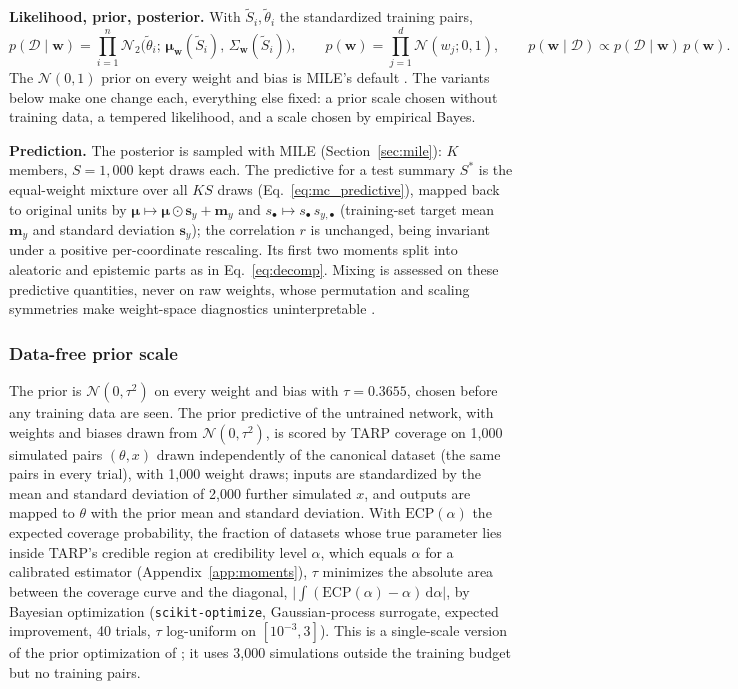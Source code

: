 \documentclass[11pt]{article}
\newcommand{\code}[1]{\texttt{#1}}
\begin{document}
\textbf{Likelihood, prior, posterior.} With $\tilde S_i,\tilde\theta_i$ the standardized training pairs,
\begin{equation}
p(\mathcal{D}\mid\mathbf w)=\prod_{i=1}^{n}\mathcal{N}_2\!\big(\tilde\theta_i;\,\boldsymbol\mu_{\mathbf w}(\tilde S_i),\,
\Sigma_{\mathbf w}(\tilde S_i)\big),\qquad
p(\mathbf w)=\prod_{j=1}^{d}\mathcal{N}(w_j;0,1),\qquad
p(\mathbf w\mid\mathcal{D})\propto p(\mathcal{D}\mid\mathbf w)\,p(\mathbf w).
\end{equation}
The $\mathcal{N}(0,1)$ prior on every weight and bias is MILE's default \citep{sommer2025mile}. The variants below
make one change each, everything else fixed: a prior scale chosen without training data, a tempered likelihood, and a
scale chosen by empirical Bayes.

\textbf{Prediction.} The posterior is sampled with MILE (Section~\ref{sec:mile}): $K$ members, $S=1{,}000$ kept
draws each. The predictive for a test summary $S^\ast$ is the equal-weight mixture over all $KS$ draws
(Eq.~\ref{eq:mc_predictive}), mapped back to original units by $\boldsymbol\mu\mapsto\boldsymbol\mu\odot\mathbf{s}_y+\mathbf{m}_y$
and $s_\bullet\mapsto s_\bullet\,s_{y,\bullet}$ (training-set target mean $\mathbf m_y$ and standard deviation
$\mathbf s_y$); the correlation $r$ is unchanged, being invariant under a positive per-coordinate rescaling. Its
first two moments split into aleatoric and epistemic parts as in Eq.~\eqref{eq:decomp}. Mixing is assessed on
these predictive quantities, never on raw weights, whose permutation and scaling symmetries make weight-space
diagnostics uninterpretable \citep{izmailov2021bnn,sommer2024connecting}.

\subsubsection{Data-free prior scale}
\label{sec:bnn_datafree}
The prior is $\mathcal{N}(0,\tau^2)$ on every weight and bias with $\tau=0.3655$, chosen before any training data are
seen. The prior predictive of the untrained network, with weights and biases drawn from $\mathcal{N}(0,\tau^2)$, is
scored by TARP coverage \citep{lemos2023tarp} on 1{,}000 simulated pairs $(\theta,x)$ drawn independently of the
canonical dataset (the same pairs in every trial), with 1{,}000 weight draws; inputs are standardized by the mean and standard deviation of 2{,}000
further simulated $x$, and outputs are mapped to $\theta$ with the prior mean and standard deviation. With
$\mathrm{ECP}(\alpha)$ the expected coverage probability, the fraction of datasets whose true parameter lies inside
TARP's credible region at credibility level $\alpha$, which equals $\alpha$ for a calibrated estimator
(Appendix~\ref{app:moments}), $\tau$ minimizes the absolute area between the coverage curve and the diagonal, $\big|\int(\mathrm{ECP}(\alpha)-\alpha)\,\mathrm{d}\alpha\big|$,
by Bayesian optimization (\code{scikit-optimize}, Gaussian-process surrogate, expected improvement, 40 trials,
$\tau$ log-uniform on $[10^{-3},3]$). This is a single-scale version of the prior optimization of
\citet{delaunoy2024lowbudget}; it uses 3{,}000 simulations outside the training budget but no training pairs.
\end{document}
